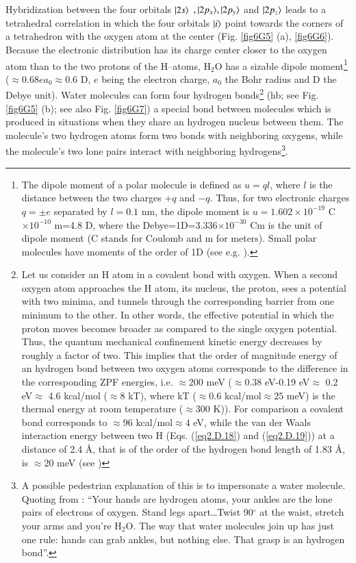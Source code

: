 \begin{subappendices}
Hybridization between the four orbitals $|{2s} \rangle$ $,|{2p_x} \rangle,|{2p_y} \rangle$ and $|{2p_z} \rangle$  leads to a tetrahedral correlation in which the four orbitals $|{i} \rangle$ point towards the corners of a tetrahedron with the oxygen atom at the center (Fig. \ref{fig6G5} (a), \ref{fig6G6}). Because the electronic distribution has its charge center closer to the oxygen atom than to the two protons of the H--atoms, H$_2$O has a sizable dipole moment\footnote{The dipole moment of a polar molecule is defined as $u=ql$, where $l$ is the distance between the two charges $+q$ and $-q$. Thus, for two electronic charges $q=\pm e$ separated by $l=0.1$ nm, the dipole moment is $u=1.602\times 10^{-19}$ C$\times10^{-10}$ m=4.8 D, where the Debye=1D=3.336$\times10^{-30}$ Cm is the unit of dipole moment (C stands for Coulomb and m for meters). Small polar molecules have moments of the order of 1D (see e.g. \cite{Israelachvili:85}).} ($\approx 0.68 ea_0\approx0.6$ D, $e$ being the electron charge, $a_0$ the Bohr radius and D the Debye unit). Water molecules can form four hydrogen bonds\footnote{Let us consider an H atom in a covalent bond with oxygen. When a second oxygen atom approaches the H atom, its nucleus, the proton, sees a potential with two minima, and tunnels through the corresponding barrier from one minimum to the other. In other words, the effective potential in which the proton moves becomes broader as compared to the single oxygen potential. Thus, the quantum mechanical confinement kinetic energy decreases by roughly a factor of two. This implies that the order of magnitude energy of an hydrogen bond between two oxygen atoms corresponds to the difference in the corresponding ZPF energies, i.e. $\approx200$ meV ($\approx 0.38$ eV-0.19 eV$\approx$ 0.2 eV$\approx$ 4.6 kcal/mol ($\approx8$ kT), where kT ($\approx0.6$ kcal/mol$\approx25$ meV) is the thermal energy at room temperature ($\approx300$ K)). For comparison a covalent  bond corresponds to $\approx96$ kcal/mol$\approx4$ eV, while the van der Waals interaction energy between two H (Eqs. (\ref{eq2.D.18}) and (\ref{eq2.D.19})) at a distance of 2.4 \AA, that is of the order of the hydrogen bond length of 1.83 \AA,  is $\approx20$ meV (see \cite{Povh:02})} (hb; see Fig. \ref{fig6G5} (b); see also Fig. \ref{fig6G7}) a special bond between molecules which is produced in situations when they share an hydrogen nucleus between them. The molecule's two hydrogen atoms form two bonds with neighboring oxygens, while the molecule's two lone pairs interact with neighboring hydrogens\footnote{A possible pedestrian explanation of this is to impersonate a water molecule. Quoting from \cite{Ball:03}: ``Your hands are hydrogen atoms, your ankles are the lone pairs of electrons of oxygen. Stand legs apart\dots Twist 90$^\circ$ at the waist, stretch your arms and you're H$_2$O. The way that water molecules join up has just one rule: hands can grab ankles, but nothing else. That grasp is an hydrogen bond''.}. 



\end{subappendices}
